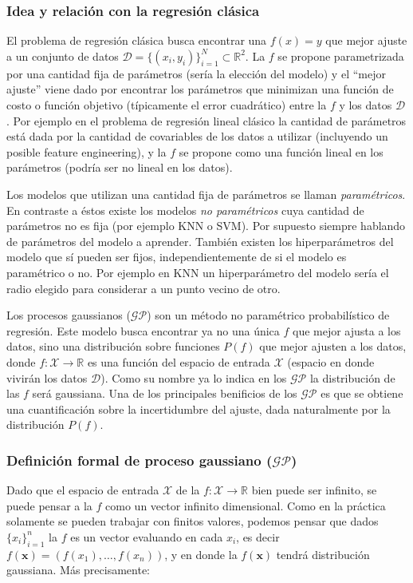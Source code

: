 \documentclass[a4paper]{article}
\newcommand{\gp}{\ensuremath{\mathcal{GP}}}
\begin{document}
\subsubsection{Idea y relación con la regresión clásica}
\label{subsubsec:ideagp}
El problema de regresión clásica busca encontrar una $f(x)=y$ que mejor ajuste a un conjunto de datos $\mathcal{D}=\{(x_i, y_i)\}_{i=1}^N \subset \mathbb{R}^2$. La $f$ se propone parametrizada por una cantidad fija de parámetros (sería la elección del modelo) y el ``mejor ajuste'' viene dado por encontrar los parámetros que minimizan una función de costo o función objetivo (típicamente el error cuadrático) entre la $f$ y los datos $\mathcal{D}$. Por ejemplo en el problema de regresión lineal clásico la cantidad de parámetros está dada por la cantidad de covariables de los datos a utilizar (incluyendo un posible feature engineering), y la $f$ se propone como una función lineal en los parámetros (podría ser no lineal en los datos).

Los modelos que utilizan una cantidad fija de parámetros se llaman \emph{paramétricos}. En contraste a éstos existe los modelos \emph{no paramétricos} cuya cantidad de parámetros no es fija (por ejemplo KNN o SVM). Por supuesto siempre hablando de parámetros del modelo a aprender. También existen los hiperparámetros del modelo que sí pueden ser fijos, independientemente de si el modelo es paramétrico o no. Por ejemplo en KNN un hiperparámetro del modelo sería el radio elegido para considerar a un punto vecino de otro.

Los procesos gaussianos ($\gp$) son un método no paramétrico probabilístico de regresión. Este modelo busca encontrar ya no una única $f$ que mejor ajusta a los datos, sino una distribución sobre funciones $P(f)$ que mejor ajusten a los datos, donde $f: \mathcal{X} \to \mathbb{R}$ es una función del espacio de entrada  $\mathcal{X}$ (espacio en donde vivirán los datos $\mathcal{D}$). Como su nombre ya lo indica en los $\gp$ la distribución de las $f$ será gaussiana. Una de los principales benificios de los $\gp$ es que se obtiene una cuantificación sobre la incertidumbre del ajuste, dada naturalmente por la distribución $P(f)$.

\subsubsection{Definición formal de proceso gaussiano ($\gp$)}
\label{subsubsec:defgp}
Dado que el espacio de entrada $\mathcal{X}$ de la $f:\mathcal{X} \to \mathbb{R}$ bien puede ser infinito, se puede pensar a la $f$ como un vector infinito dimensional. Como en la práctica solamente se pueden trabajar con finitos valores, podemos pensar que dados $\{x_i\}_{i=1}^n$ la $f$ es un vector evaluando en cada $x_i$, es decir $f(\mathbf{x}) = \left(f(x_1),\dots,f(x_n)\right)$, y en donde la $f(\mathbf{x})$ tendrá distribución gaussiana. Más precisamente:
\end{document}
